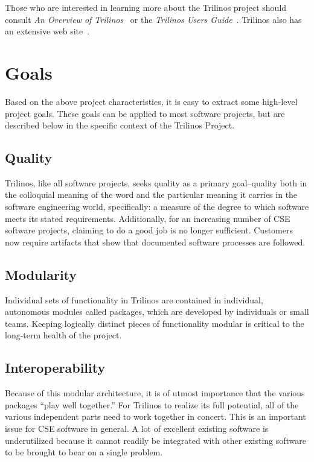 \documentclass[12pt,relax]{article}
\begin{document}
Those who are interested in learning more about the Trilinos project should
consult {\it An Overview of Trilinos}~\cite{Trilinos-Overview} or the
{\it Trilinos Users Guide}~\cite{Trilinos-Users-Guide}.  Trilinos also has an
extensive web site~\cite{Trilinos-home-page}.


\section{Goals}
\label{Section:Goals}

Based on the above project characteristics, it is easy to extract some 
high-level project goals.  These goals can be applied to most software projects,
but are described below in the specific context of the Trilinos Project.

\subsection{Quality}
Trilinos, like all software projects, seeks quality as a primary goal--quality
both in the colloquial meaning of the word and the particular meaning it
carries in the software engineering world, specifically:  a measure of the
degree to which software meets its stated requirements.  Additionally, for an 
increasing number of CSE software projects, claiming to do a good job is no 
longer sufficient.  Customers now require artifacts that show that documented 
software processes are followed.

\subsection{Modularity}
Individual sets of functionality in Trilinos are contained in individual,
autonomous modules called packages, which are developed by individuals or small
teams.  Keeping logically distinct pieces of functionality modular is critical
to the long-term health of the project.  

\subsection{Interoperability}
Because of this modular architecture, it is of utmost importance that the
various packages ``play well together.''  For Trilinos to realize its full
potential, all of the various independent parts need to work together in
concert.  This is an important issue for CSE software in general.  A lot of
excellent existing software is underutilized because it cannot readily be
integrated with other existing software to be brought to bear on a single
problem.
\end{document}
